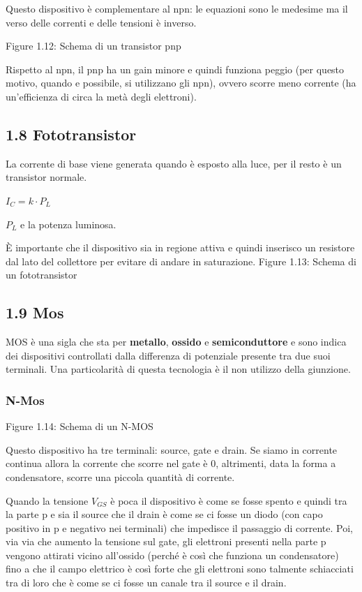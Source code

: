 \documentclass[
]{article}
\begin{document}
Questo dispositivo è complementare al npn: le equazioni sono le medesime
ma il verso delle correnti e delle tensioni è inverso.

Figure 1.12: Schema di un transistor pnp

Rispetto al npn, il pnp ha un gain minore e quindi funziona peggio (per
questo motivo, quando e possibile, si utilizzano gli npn), ovvero scorre
meno corrente (ha un'efficienza di circa la metà degli elettroni).

\subsection{1.8 Fototransistor}\label{fototransistor}

La corrente di base viene generata quando è esposto alla luce, per il
resto è un transistor normale.

\(I_{C}=k\cdot P_{L}\)

\(P_{L}\) e la potenza luminosa.

È importante che il dispositivo sia in regione attiva e quindi inserisco
un resistore dal lato del collettore per evitare di andare in
saturazione. Figure 1.13: Schema di un fototransistor

\subsection{1.9 Mos}\label{mos}

MOS è una sigla che sta per \textbf{metallo}, \textbf{ossido} e
\textbf{semiconduttore} e sono indica dei dispositivi controllati dalla
differenza di potenziale presente tra due suoi terminali. Una
particolarità di questa tecnologia è il non utilizzo della giunzione.

\subsubsection{N-Mos}\label{n-mos}

Figure 1.14: Schema di un N-MOS

Questo dispositivo ha tre terminali: source, gate e drain. Se siamo in
corrente continua allora la corrente che scorre nel gate è 0,
altrimenti, data la forma a condensatore, scorre una piccola quantità di
corrente.

Quando la tensione \(V_{GS}\) è poca il dispositivo è come se fosse
spento e quindi tra la parte p e sia il source che il drain è come se ci
fosse un diodo (con capo positivo in p e negativo nei terminali) che
impedisce il passaggio di corrente. Poi, via via che aumento la tensione
sul gate, gli elettroni presenti nella parte p vengono attirati vicino
all'ossido (perché è così che funziona un condensatore) fino a che il
campo elettrico è così forte che gli elettroni sono talmente schiacciati
tra di loro che è come se ci fosse un canale tra il source e il drain.
\end{document}
